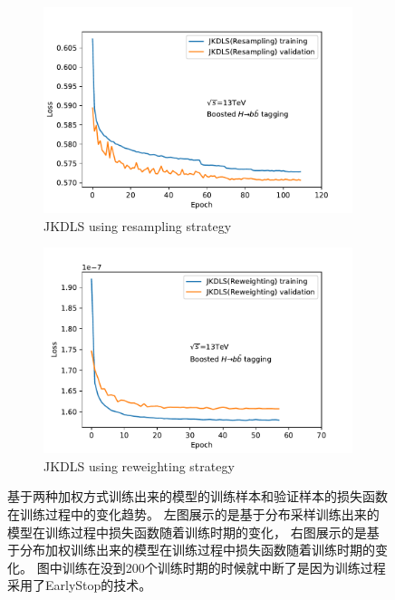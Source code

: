 \begin{figure}[htbp]
  \begin{subfigure}{.5\textwidth}
  \centering
   \includegraphics[width=0.99\textwidth]{figuresXbb/Reweight/LOSSResample.pdf}
   \caption{JKDLS using resampling strategy}
  \end{subfigure}
  \begin{subfigure}{.5\textwidth}
  \centering
   \includegraphics[width=0.99\textwidth]{figuresXbb/Reweight/LOSSReweight.pdf}
   \caption{JKDLS using reweighting strategy}
  \end{subfigure}
  \caption{ 
  基于两种加权方式训练出来的模型的训练样本和验证样本的损失函数在训练过程中的变化趋势。
左图展示的是基于分布采样训练出来的模型在训练过程中损失函数随着训练时期的变化，
右图展示的是基于分布加权训练出来的模型在训练过程中损失函数随着训练时期的变化。
图中训练在没到200个训练时期的时候就中断了是因为训练过程采用了EarlyStop的技术。
   }
  \label{fig:WEILOSS}
\end{figure} 




